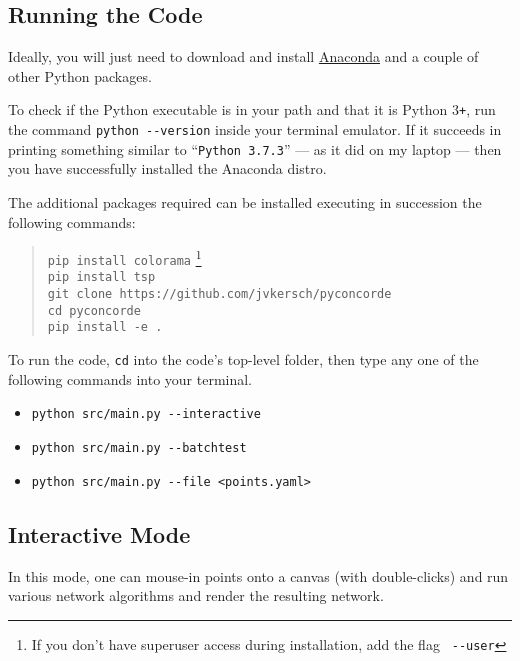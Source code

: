 \begin{appendices}
\renewcommand{\thesection}{\Roman{section}\;\;}
\section{Running the Code}

Ideally, you will just need to download and install \href{https://www.anaconda.com/products/individual}{Anaconda} and a couple of other Python packages.  

To check if the Python executable is in your path and that it is Python 3\texttt{+}, run the command \verb|python --version| 
inside your terminal emulator. If it succeeds in printing something similar to ``\verb|Python 3.7.3|'' --- as it did on my laptop --- then 
you have successfully installed the Anaconda distro. 

The additional packages required can be installed executing in succession the following commands:
\begin{quote}
\color{blue}
\texttt{pip install colorama}  \footnote{If you don't have superuser access during installation, add the flag \texttt{\color{red} \texttt{-{}-}user}}  \\
\texttt{pip install tsp} \\
\texttt{git clone https://github.com/jvkersch/pyconcorde} \\
\texttt{cd pyconcorde}\\
\texttt{pip install -e .}
\end{quote}


To run the code, \texttt{cd} into the code's top-level folder, then type any one of the following commands into your terminal. 

\begin{itemize}
\item \verb|python src/main.py --interactive|
\item \verb|python src/main.py --batchtest|
\item \verb|python src/main.py --file <points.yaml>|
\end{itemize}

\subsection{Interactive Mode}

In this mode, one can mouse-in points onto a canvas (with double-clicks) and run various network algorithms and render the 
resulting network. 


\end{appendices}
